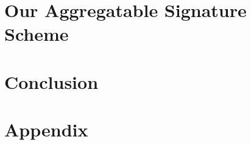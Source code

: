 \documentclass{llncs}
\begin{document}
\section{Our Aggregatable Signature Scheme} \label{sec:aggregate}


% 


\section{Conclusion} \label{sec:conclusion}


 


\appendix
\section{Appendix} \label{sec:appendix}
 
\end{document}
